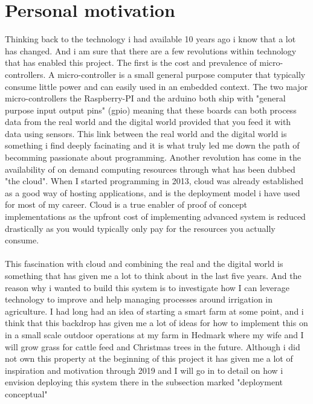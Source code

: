 \documentclass[]{uiophd}
\begin{document}
\section{Personal motivation}
Thinking back to the technology i had available 10 years ago i know that a lot has changed. And i am sure that there are a few revolutions within technology that has enabled this project. The first is the cost and prevalence of micro-controllers. A micro-controller is a small general purpose computer that typically consume little power and can easily used in an embedded context. The two major micro-controllers the Raspberry-PI and the arduino both ship with "general purpose input output pins" (gpio) meaning that these boards can both process data from the real world and the digital world provided that you feed it with data using sensors. This link between the real world and the digital world is something i find deeply facinating and it is what truly led me down the path of becomming passionate about programming. Another revolution has come in the availability of on demand computing resources through what has been dubbed "the cloud". When I started programming in 2013, cloud was already established as a good way of hosting applications, and is the deployment model i have used for most of my career. Cloud is a true enabler of proof of concept implementations as the upfront cost of implementing advanced system is reduced drastically as you would typically only pay for the resources you actually consume.
\\\\
This fascination with cloud and combining the real and the digital world is something that has given me a lot to think about in the last five years. And the reason why i wanted to build this system is to investigate how I can leverage technology to improve and help managing processes around irrigation in agriculture. I had long had an idea of starting a smart farm at some point, and i think that this backdrop has given me a lot of ideas for how to implement this on in a small scale outdoor operations at my farm in Hedmark where my wife and I will grow grass for cattle feed and Christmas trees in the future. Although i did not own this property at the beginning of this project it has given me a lot of inspiration and motivation through 2019 and I will go in to detail on how i envision deploying this system there in the subsection marked "deployment conceptual"
\end{document}
